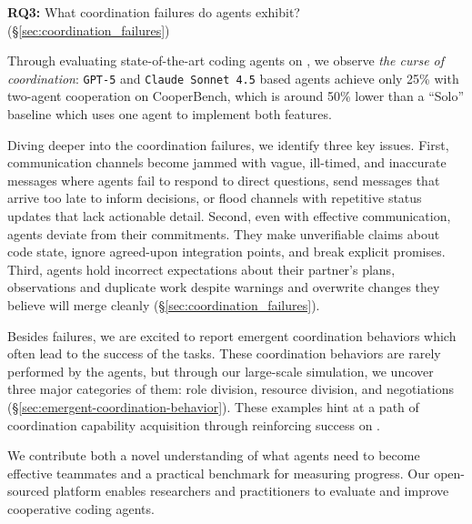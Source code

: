 \noindent\textbf{RQ3:} What coordination failures do agents exhibit? (\S\ref{sec:coordination_failures})

Through evaluating state-of-the-art coding agents on \dataset, we observe \emph{the curse of coordination}: \texttt{GPT-5} and \texttt{Claude Sonnet 4.5} based agents achieve only 25\% with two-agent cooperation on CooperBench, which is around 50\% lower than a ``Solo'' baseline which uses one agent to implement both features. 

Diving deeper into the coordination failures, we identify three key issues. First, communication channels become jammed with vague, ill-timed, and inaccurate messages where agents fail to respond to direct questions, send messages that arrive too late to inform decisions, or flood channels with repetitive status updates that lack actionable detail.
Second, even with effective communication, agents deviate from their commitments. They make unverifiable claims about code state, ignore agreed-upon integration points, and break explicit promises.
Third, agents hold incorrect expectations about their partner's plans, observations and duplicate work despite warnings and overwrite changes they believe will merge cleanly (\S\ref{sec:coordination_failures}).

Besides failures, we are excited to report emergent coordination behaviors which often lead to the success of the \dataset tasks. These coordination behaviors are rarely performed by the agents, but through our large-scale simulation, we uncover three major categories of them: role division, resource division, and negotiations (\S\ref{sec:emergent-coordination-behavior}). These examples hint at a path of coordination capability acquisition through reinforcing success on \dataset. 

We contribute both a novel understanding of what agents need to become effective teammates and a practical benchmark for measuring progress. Our open-sourced \dataset platform enables researchers and practitioners to evaluate and improve cooperative coding agents.
